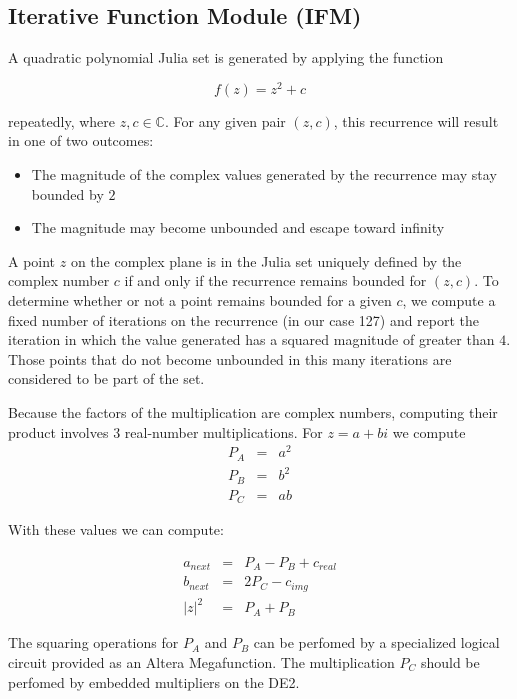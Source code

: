\documentclass{article}
\begin{document}
\subsection{Iterative Function Module (IFM)}

A quadratic polynomial Julia set is generated by applying the function

\begin{equation}
f(z) = z^2 + c
\end{equation}

repeatedly, where $z,c \in \mathbb{C}$. For any given pair $(z, c)$, this recurrence will result in one of two outcomes:
\begin{itemize}
\item The magnitude of the complex values generated by the recurrence may stay bounded by $2$
\item The magnitude may become unbounded and escape toward infinity
\end{itemize}

A point $z$ on the complex plane is in the Julia set uniquely defined by the complex number $c$ if and only if the 
recurrence remains bounded for $(z, c)$. To determine whether or not a point remains bounded for a given $c$, we compute
a fixed number of iterations on the recurrence (in our case 127) and report the iteration in which the value generated has
a squared magnitude of greater than $4$. Those points that do not become unbounded in this many iterations are considered
to be part of the set.

Because the factors of the multiplication are complex numbers, computing their product involves
3 real-number multiplications. For $z = a + bi$ we compute\\

\begin{eqnarray}
P_A &=& a^2 \nonumber \\
P_B &=& b^2 \nonumber \\
P_C &=& ab \nonumber
\end{eqnarray}

With these values we can compute:

\begin{eqnarray}
a_{next} &=& P_A - P_B + c_{real}\nonumber \\
b_{next} &=& 2P_C - c_{img} \nonumber \\
|z|^2 &=& P_A + P_B \nonumber 
\end{eqnarray}

The squaring operations for $P_A$ and $P_B$ can be perfomed by a specialized logical circuit provided as an Altera Megafunction. The multiplication $P_C$ should be perfomed by embedded multipliers on the DE2.
\end{document}
